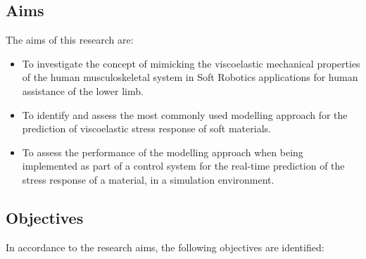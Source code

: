 \subsection{Aims}

The aims of this research are:

\begin{itemize}
    \item To investigate the concept of mimicking the viscoelastic mechanical properties of the human musculoskeletal system in Soft Robotics applications for human assistance of the lower limb.
    \item To identify and assess the most commonly used modelling approach for the prediction of viscoelastic stress response of soft materials.
    \item To assess the performance of the modelling approach when being implemented as part of a control system for the real-time prediction of the stress response of a material, in a simulation environment.
\end{itemize}

\subsection{Objectives}

In accordance to the research aims, the following objectives are identified:

